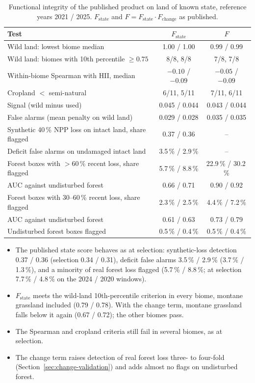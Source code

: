 \documentclass[11pt,a4paper]{article}
\begin{document}
\begin{table}[H]
\centering\small
\caption{Functional integrity of the published product on land of known state, reference years
2021 / 2025. $F_{\text{state}}$ and $F = F_{\text{state}} \cdot F_{\text{change}}$ as published.}
\label{tab:fi-final}
\begin{tabular}{lcc}
\toprule
Test & $F_{\text{state}}$ & $F$ \\
\midrule
Wild land: lowest biome median & 1.00 / 1.00 & 0.99 / 0.99 \\
Wild land: biomes with 10th percentile $\ge 0.75$ & 8/8, 8/8 & 7/8, 7/8 \\
Within-biome Spearman with HII, median & $-0.10$ / $-0.09$ & $-0.05$ / $-0.09$ \\
Cropland $<$ semi-natural & 6/11, 5/11 & 7/11, 6/11 \\
Signal (wild minus used) & 0.045 / 0.044 & 0.043 / 0.044 \\
False alarms (mean penalty on wild land) & 0.029 / 0.028 & 0.035 / 0.035 \\
Synthetic 40\,\% NPP loss on intact land, share flagged & 0.37 / 0.36 & -- \\
Deficit false alarms on undamaged intact land & 3.5\,\% / 2.9\,\% & -- \\
Forest boxes with $>60\,\%$ recent loss, share flagged & 5.7\,\% / 8.8\,\% & 22.9\,\% / 30.2\,\% \\
\quad AUC against undisturbed forest & 0.66 / 0.71 & 0.90 / 0.92 \\
Forest boxes with 30--60\,\% recent loss, share flagged & 2.3\,\% / 2.5\,\% & 4.4\,\% / 7.2\,\% \\
\quad AUC against undisturbed forest & 0.61 / 0.63 & 0.73 / 0.79 \\
Undisturbed forest boxes flagged & 0.5\,\% / 0.4\,\% & 0.5\,\% / 0.4\,\% \\
\bottomrule
\end{tabular}
\end{table}

\begin{itemize}
\item The published state score behaves as at selection: synthetic-loss detection 0.37 / 0.36
(selection 0.34 / 0.31), deficit false alarms 3.5\,\% / 2.9\,\% (3.7\,\% / 1.3\,\%), and a
minority of real forest loss flagged (5.7\,\% / 8.8\,\%; at selection 7.7\,\% / 4.8\,\% on the
2024 / 2020 windows).
\item $F_{\text{state}}$ meets the wild-land 10th-percentile criterion in every biome, montane
grassland included (0.79 / 0.78). With the change term, montane grassland falls below it again
(0.67 / 0.72); the other biomes pass.
\item The Spearman and cropland criteria still fail in several biomes, as at selection.
\item The change term raises detection of real forest loss three- to four-fold
(Section~\ref{sec:change-validation}) and adds almost no flags on undisturbed forest.
\end{itemize}
\end{document}
